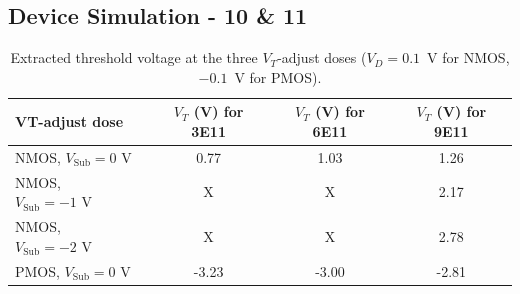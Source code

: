 \subsection{Device Simulation - 10 \& 11}


\begin{table}[H]
    \centering
    \caption{Extracted threshold voltage at the three $V_T$-adjust doses
    ($V_D = 0.1$~V for NMOS, $-0.1$~V for PMOS).}
    \label{tab:vt_adjust}
    \begin{tabular}{ l c c c}
        \toprule
        \textbf{VT-adjust dose} & \textbf{$V_T$ (V) for 3E11} & \textbf{$V_T$ (V) for 6E11} & \textbf{$V_T$ (V) for 9E11} \\
        \midrule
        NMOS, $V_{\text{Sub}} = 0\text{ V}$  & 0.77  & 1.03  & 1.26 \\
        NMOS, $V_{\text{Sub}} = -1\text{ V}$ & X     & X     & 2.17 \\
        NMOS, $V_{\text{Sub}} = -2\text{ V}$ & X     & X     & 2.78 \\
        PMOS, $V_{\text{Sub}} = 0\text{ V}$  & -3.23 & -3.00   & -2.81 \\
        \bottomrule
    \end{tabular}
\end{table}




